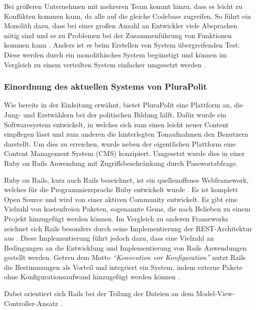 Bei größeren Unternehmen mit mehreren Team kommt hinzu, dass es leicht zu Konflikten kommen kann, da alle auf die gleiche Codebase zugreifen. So führt ein Monolith dazu, dass bei einer großen Anzahl an Entwickler viele Absprachen nötig sind und es zu Problemen bei der Zusammenführung von Funktionen kommen kann \parencite[vgl.][Kap. 2.2.4]{newman_monolith_2019}. Anders ist es beim Erstellen von System übergreifenden Test: Diese werden durch ein monolithisches System begünstigt und können im Vergleich zu einem verteilten System einfacher umgesetzt werden  \parencite[vgl.][Kap. 2.2.5]{newman_monolith_2019}.

\subsubsection{Einordnung des aktuellen Systems von PluraPolit}

Wie bereits in der Einleitung erwähnt, bietet PluraPolit eine Plattform an, die Jung- und Erstwählern bei der politischen Bildung hilft. Dafür wurde ein Softwaresystem entwickelt, in welches sich zum einen leicht neuer Content einpflegen lässt und zum anderen die hinterlegten Tonaufnahmen den Benutzern darstellt.
Um dies zu erreichen, wurde neben der eigentlichen Plattform eine Content Management System (CMS) konzipiert. Umgesetzt wurde dies in einer Ruby on Rails Anwendung mit Zugriffsbeschränkung durch Passwortabfrage.

Ruby on Rails, kurz auch Rails bezeichnet, ist ein quellenoffenes Webframework, welches für die Programmiersprache Ruby entwickelt wurde \parencites[vgl.][S.4]{hartl_ruby_2016}{ruby_org}[vgl.][S. 24]{sieben_wochen}. Es ist komplett Open Source und wird von einer aktiven Community entwickelt. Es gibt eine Vielzahl von kostenfreien Paketen, sogenannte Gems, die nach Belieben zu einem Projekt hinzugefügt werden können. Im Vergleich zu anderen Frameworks zeichnet sich Rails besonders durch seine Implementierung der REST-Architektur aus \parencite[vgl.][S. 5]{hartl_ruby_2016}. Diese Implementierung führt jedoch dazu, dass eine Vielzahl an Bedingungen an die Entwicklung und Implementierung von Rails Anwendungen gestellt werden. Getreu dem Motto \textit{\enquote{Konvention vor Konfiguration}} nutzt Rails die Bestimmungen als Vorteil und integriert ein System, indem externe Pakete ohne Konfigurationsaufwand hinzugefügt werden können \parencite{ruby_doctrine}.

Dabei orientiert sich Rails bei der Teilung der Dateien an dem Model-View-Controller-Ansatz \parencites[vgl.][S. 66 ff.]{hartl_ruby_2016}.

